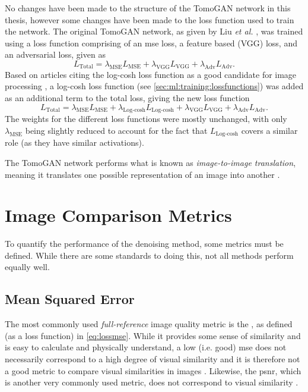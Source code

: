 No changes have been made to the structure of the TomoGAN network in this thesis, however some changes have been made to the loss function used to train the network. The original TomoGAN network, as given by Liu \textit{et al.} \cite{liu2020tomogan}, was trained using a loss function comprising of an \gls{mse} loss, a feature based (VGG) loss, and an adversarial loss, given as 
\begin{equation}
    L_{\text{Total}} = \lambda_{\text{MSE}}L_{\text{MSE}} + \lambda_{\text{VGG}}L_{\text{VGG}} + \lambda_{\text{Adv}}L_{\text{Adv}}.
\end{equation}
Based on articles citing the log-cosh loss function as a good candidate for image processing \cite{7797130,chen2019log}, a log-cosh loss function (see \cref{sec:ml:training:lossfunctions}) was added as an additional term to the total loss, giving the new loss function
\begin{equation}
    L_{\text{Total}} = \lambda_{\text{MSE}}L_{\text{MSE}} + \lambda_{\text{Log-cosh}}L_{\text{Log-cosh}} + \lambda_{\text{VGG}}L_{\text{VGG}} + \lambda_{\text{Adv}}L_{\text{Adv}}.
\end{equation}
The weights for the different loss functions were mostly unchanged, with only $\lambda_\text{MSE}$ being slightly reduced to account for the fact that $L_\text{Log-cosh}$ covers a similar role (as they have similar activations). 

The TomoGAN network performs what is known as \textit{image-to-image translation}, meaning it translates one possible representation of an image into another \cite{pang2021imagetoimage,isola2018imagetoimage}.

\section{Image Comparison Metrics}
\label{sec:method:metrics}
To quantify the performance of the denoising method, some metrics must be defined. While there are some standards to doing this, not all methods perform equally well. 

\subsection{Mean Squared Error}
\label{sec:method:metrics:mse}
The most commonly used \textit{full-reference} image quality metric is the , as defined (as a loss function) in \cref{eq:lossmse}. While it provides some sense of similarity and is easy to calculate and physically understand, a low (i.e. good) \gls{mse} does not necessarily correspond to a high degree of visual similarity and it is therefore not a good metric to compare visual similarities in images \cite{413502,477498}. Likewise, the \gls{psnr}, which is another very commonly used metric, does not correspond to visual similarity \cite{477498}. 

